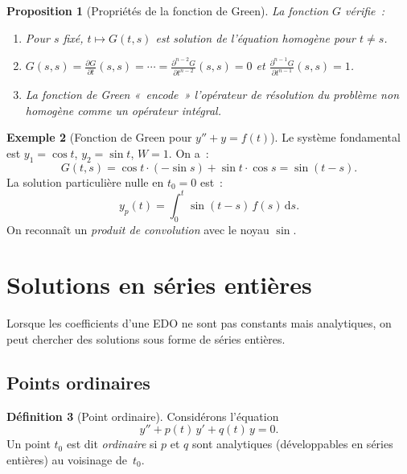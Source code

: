 \documentclass[12pt,a4paper,openany]{book}
\theoremstyle{definition}
\newtheorem{definition}{Définition}[chapter]
\newtheorem{exemple}[definition]{Exemple}
\theoremstyle{plain}
\newtheorem{proposition}[definition]{Proposition}
\theoremstyle{remark}
\newcommand{\dd}{\mathrm{d}}
\begin{document}
\begin{proposition}[Propriétés de la fonction de Green]\label{prop:green-proprietes}
  La fonction $G$ vérifie~:
  \begin{enumerate}[label=(\roman*)]
    \item Pour $s$ fixé, $t \mapsto G(t,s)$ est solution de l'équation
      homogène pour $t \neq s$.
    \item $G(s,s) = \frac{\partial G}{\partial t}(s,s)
      = \cdots = \frac{\partial^{n-2} G}{\partial t^{n-2}}(s,s) = 0$
      et $\frac{\partial^{n-1} G}{\partial t^{n-1}}(s,s) = 1$.
    \item La fonction de Green «~encode~» l'opérateur de résolution
      du problème non homogène comme un opérateur intégral.
  \end{enumerate}
\end{proposition}

\begin{exemple}[Fonction de Green pour $y'' + y = f(t)$]\label{ex:green-ordre2}
  Le système fondamental est $y_1 = \cos t$, $y_2 = \sin t$,
  $W = 1$. On a~:
  \[
    G(t,s) = \cos t\cdot(-\sin s) + \sin t \cdot \cos s = \sin(t - s).
  \]
  La solution particulière nulle en $t_0 = 0$ est~:
  \[
    y_p(t) = \int_0^t \sin(t-s)\,f(s)\,\dd s.
  \]
  On reconnaît un \emph{produit de convolution}
  avec le noyau $\sin$.
\end{exemple}

\section{Solutions en séries entières}\label{sec:series-entieres}


Lorsque les coefficients d'une EDO ne sont pas constants mais
analytiques, on peut chercher des solutions sous forme de séries
entières.

\subsection{Points ordinaires}\label{subsec:points-ordinaires}

\begin{definition}[Point ordinaire]\label{def:point-ordinaire}
  Considérons l'équation
  \begin{equation}\label{eq:edo-series}
    y'' + p(t)\,y' + q(t)\,y = 0.
  \end{equation}
  Un point $t_0$ est dit \emph{ordinaire} si $p$ et $q$ sont
  analytiques (développables en séries entières) au voisinage de~$t_0$.
\end{definition}
\end{document}
